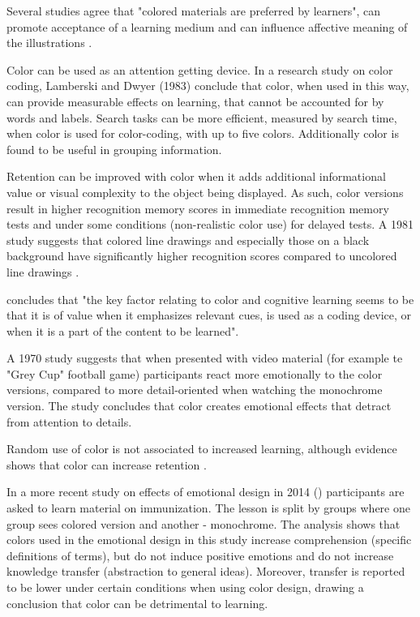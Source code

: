 		Several studies agree that "colored materials are preferred by learners", can promote acceptance of a learning medium and can influence affective meaning of the illustrations \cite[p.25]{Pert1996}.
		
		Color can be used as an attention getting device. In a research study on color coding, Lamberski and Dwyer (1983) conclude that color, when used in this way, can provide measurable effects on learning, that cannot be accounted for by words and labels. 
		Search tasks can be more efficient, measured by search time, when color is used for color-coding, with up to five colors. Additionally color is found to be useful in grouping information. \cite{Pert1996}
		
		Retention can be improved with color when it adds additional informational value or visual complexity to the object being displayed. As such, color versions result in higher recognition memory scores in immediate recognition memory tests and under some conditions (non-realistic color use) for delayed tests. A 1981 study suggests that colored line drawings and especially those on a black background have significantly higher recognition scores compared to uncolored line drawings \cite{Pert1996}.
		
		\cite{Pert1996} concludes that "the key factor relating to color and cognitive learning seems to be that it is of value when it emphasizes relevant cues, is used as a coding device, or when it is a part of the content to be learned".
		
		A 1970 study suggests that when presented with video material (for example te "Grey Cup" football game) participants react more emotionally to the color versions, compared to more detail-oriented when watching the monochrome version.	The study concludes that color creates emotional effects that detract from attention to details.
		
		Random use of color is not associated to increased learning, although evidence shows that color can increase retention \cite{Pert1996}.

		In a more recent study on effects of emotional design in 2014 (\cite{Plass2014}) participants are asked to learn material on immunization. The lesson is split by groups where one group sees colored version and another - monochrome. The analysis shows that colors used in the emotional design in this study increase comprehension (specific definitions of terms), but do not induce positive emotions and do not increase knowledge transfer (abstraction to general ideas). Moreover, transfer is reported to be lower under certain conditions when using color design, drawing a conclusion that color can be detrimental to learning.
				
